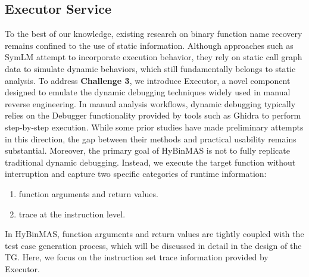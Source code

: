 \documentclass[acmsmall,screen,review,anonymous]{acmart} %
\begin{document}
\subsection{Executor Service}
To the best of our knowledge, existing research on binary function name recovery\cite{SymGen, FoC, SymLM, AsmDepictor, XFL} remains confined to the use of static information. Although approaches such as SymLM\cite{SymLM} attempt to incorporate execution behavior, they rely on static call graph data to simulate dynamic behaviors, which still fundamentally belongs to static analysis. To address \textbf{Challenge 3}, we introduce Executor, a novel component designed to emulate the dynamic debugging techniques widely used in manual reverse engineering. In manual analysis workflows, dynamic debugging typically relies on the Debugger functionality provided by tools such as Ghidra\cite{Ghidra} to perform step-by-step execution. While some prior studies have made preliminary attempts in this direction, the gap between their methods and practical usability remains substantial. Moreover, the primary goal of HyBinMAS is not to fully replicate traditional dynamic debugging. Instead, we execute the target function without interruption and capture two specific categories of runtime information:
\begin{enumerate}
    \item function arguments and return values.
    \item trace at the instruction level.
\end{enumerate}

In HyBinMAS, function arguments and return values are tightly coupled with the test case generation process, which will be discussed in detail in the design of the TG. Here, we focus on the instruction set trace information provided by Executor.
\end{document}
